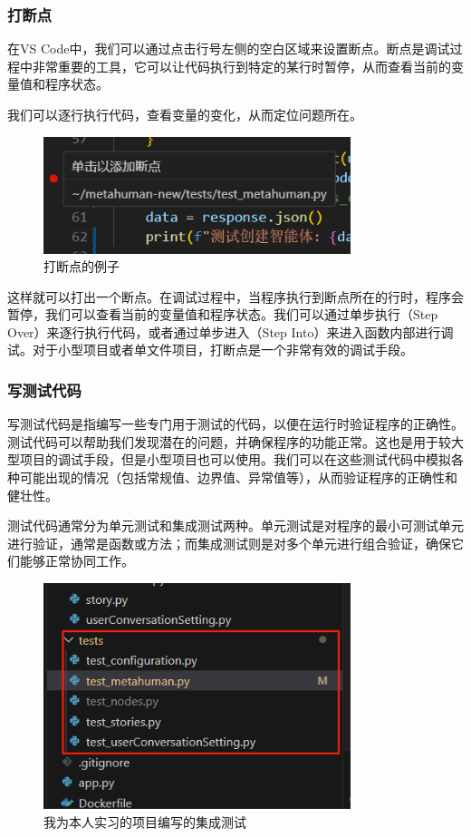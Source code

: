 \documentclass[../main.tex]{subfiles}
\begin{document}
\subsubsection{打断点}

在VS Code中，我们可以通过点击行号左侧的空白区域来设置断点。断点是调试过程中非常重要的工具，它可以让代码执行到特定的某行时暂停，从而查看当前的变量值和程序状态。

我们可以逐行执行代码，查看变量的变化，从而定位问题所在。

\begin{figure}[htbp]
\centering
\includegraphics[width=0.8\textwidth]{images/breakpoints.png}
\caption{打断点的例子}
\end{figure}

这样就可以打出一个断点。在调试过程中，当程序执行到断点所在的行时，程序会暂停，我们可以查看当前的变量值和程序状态。我们可以通过单步执行（Step Over）来逐行执行代码，或者通过单步进入（Step Into）来进入函数内部进行调试。对于小型项目或者单文件项目，打断点是一个非常有效的调试手段。

\subsubsection{写测试代码}

写测试代码是指编写一些专门用于测试的代码，以便在运行时验证程序的正确性。测试代码可以帮助我们发现潜在的问题，并确保程序的功能正常。这也是用于较大型项目的调试手段，但是小型项目也可以使用。我们可以在这些测试代码中模拟各种可能出现的情况（包括常规值、边界值、异常值等），从而验证程序的正确性和健壮性。

测试代码通常分为单元测试和集成测试两种。单元测试是对程序的最小可测试单元进行验证，通常是函数或方法；而集成测试则是对多个单元进行组合验证，确保它们能够正常协同工作。

\begin{figure}[htbp]
\centering
\includegraphics[width=0.8\textwidth]{images/tests.png}
\caption{我为本人实习的项目编写的集成测试}
\end{figure}
\end{document}
